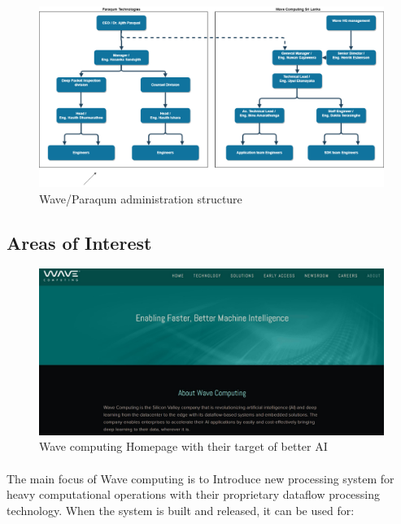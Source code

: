 \begin{figure}[h]
    \centering
    \includegraphics[trim=0cm 0cm 0cm 0cm, clip=true,scale=0.25]{figures/admin_struct.png}
    \caption{Wave/Paraqum administration structure \label{Fig:adminstruct}}\vspace{-4mm}
    \end{figure}

\subsection{Areas of Interest}

\begin{figure}[h]
    \centering
    \includegraphics[trim=0cm 0cm 0cm 0cm, clip=true,scale=0.25]{figures/wave_site.jpg}
    \caption{Wave computing Homepage with their target of better AI\label{Fig:wavesite}}\vspace{-4mm}
    \end{figure}

\paragraph{}
The main focus of Wave computing is to Introduce new processing system for heavy computational operations with their proprietary dataflow processing technology. When the system is built and released, it can be used for:

